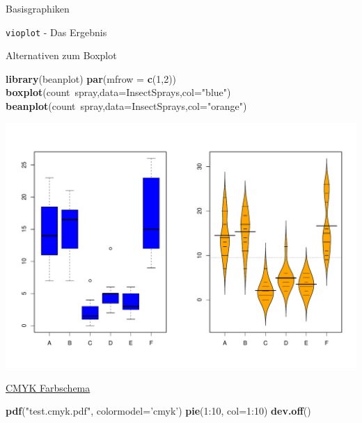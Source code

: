 \documentclass[ignorenonframetext,]{beamer}
\newenvironment{Shaded}{}{}
\newcommand{\KeywordTok}[1]{\textcolor[rgb]{0.00,0.44,0.13}{\textbf{{#1}}}}
\newcommand{\DataTypeTok}[1]{\textcolor[rgb]{0.56,0.13,0.00}{{#1}}}
\newcommand{\DecValTok}[1]{\textcolor[rgb]{0.25,0.63,0.44}{{#1}}}
\newcommand{\StringTok}[1]{\textcolor[rgb]{0.25,0.44,0.63}{{#1}}}
\newcommand{\NormalTok}[1]{{#1}}
\begin{document}
\begin{frame}[fragile]{Basisgraphiken}
\begin{block}{\texttt{vioplot} - Das Ergebnis}
\end{block}

\begin{block}{Alternativen zum Boxplot}

\begin{Shaded}
\begin{Highlighting}[]
\KeywordTok{library}\NormalTok{(beanplot)}
\KeywordTok{par}\NormalTok{(}\DataTypeTok{mfrow =} \KeywordTok{c}\NormalTok{(}\DecValTok{1}\NormalTok{,}\DecValTok{2}\NormalTok{))}
\KeywordTok{boxplot}\NormalTok{(count~spray,}\DataTypeTok{data=}\NormalTok{InsectSprays,}\DataTypeTok{col=}\StringTok{"blue"}\NormalTok{)}
\KeywordTok{beanplot}\NormalTok{(count~spray,}\DataTypeTok{data=}\NormalTok{InsectSprays,}\DataTypeTok{col=}\StringTok{"orange"}\NormalTok{)}
\end{Highlighting}
\end{Shaded}

\includegraphics{R_intern_files/figure-beamer/unnamed-chunk-170-1.pdf}

\end{block}

\begin{block}{\href{https://www.r-bloggers.com/draw-figures-in-cmyk-mode-in-r/}{CMYK
Farbschema}}

\begin{Shaded}
\begin{Highlighting}[]
\KeywordTok{pdf}\NormalTok{(}\StringTok{"test.cmyk.pdf"}\NormalTok{, }\DataTypeTok{colormodel=}\StringTok{'cmyk'}\NormalTok{)}
\KeywordTok{pie}\NormalTok{(}\DecValTok{1}\NormalTok{:}\DecValTok{10}\NormalTok{, }\DataTypeTok{col=}\DecValTok{1}\NormalTok{:}\DecValTok{10}\NormalTok{)}
\KeywordTok{dev.off}\NormalTok{() }
\end{Highlighting}
\end{Shaded}


\end{block}
\end{frame}
\end{document}
